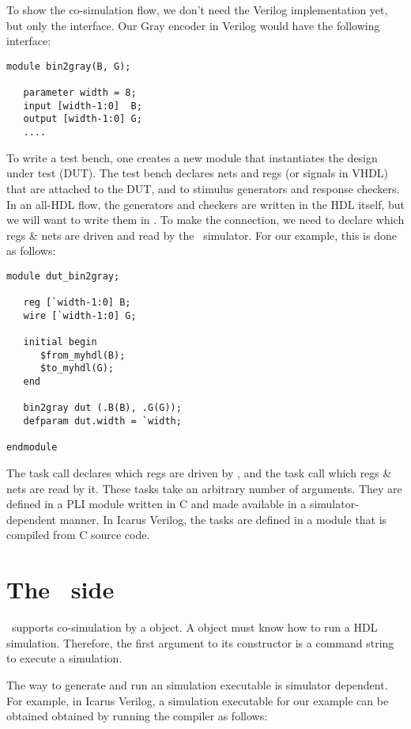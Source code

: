 To show the co-simulation flow, we don't need the Verilog
implementation yet, but only the interface.  Our Gray encoder in
Verilog would have the following interface:

\begin{verbatim}
module bin2gray(B, G);

   parameter width = 8;
   input [width-1:0]  B;     
   output [width-1:0] G;
   ....
\end{verbatim}

To write a test bench, one creates a new module that instantiates the
design under test (DUT).  The test bench declares nets and
regs (or signals in VHDL) that are attached to the DUT, and to
stimulus generators and response checkers. In an all-HDL flow, the
generators and checkers are written in the HDL itself, but we will
want to write them in \myhdl{}. To make the connection, we need to
declare which regs \& nets are driven and read by the \myhdl\
simulator. For our example, this is done as follows:

\begin{verbatim}
module dut_bin2gray;

   reg [`width-1:0] B;
   wire [`width-1:0] G;

   initial begin
      $from_myhdl(B);
      $to_myhdl(G);
   end

   bin2gray dut (.B(B), .G(G));
   defparam dut.width = `width;

endmodule
\end{verbatim}

The  task call declares which regs are driven by
\myhdl{}, and the \code{\$to_myhdl} task call which regs \& nets are read
by it. These tasks take an arbitrary number of arguments.  They are
defined in a PLI module written in C and made available in a
simulator-dependent manner.  In Icarus Verilog, the tasks are defined
in a \code{myhdl.vpi} module that is compiled from C source code.

\section{The \myhdl\ side \label{cosim-myhdl}}

\myhdl\ supports co-simulation by a  object. 
A \code{Cosimulation} object must know how to run a HDL simulation.
Therefore, the first argument to its constructor is a command string
to execute a simulation.

The way to generate and run an simulation executable is simulator
dependent.  For example, in Icarus Verilog, a simulation executable
for our example can be obtained obtained by running the
 compiler as follows:

